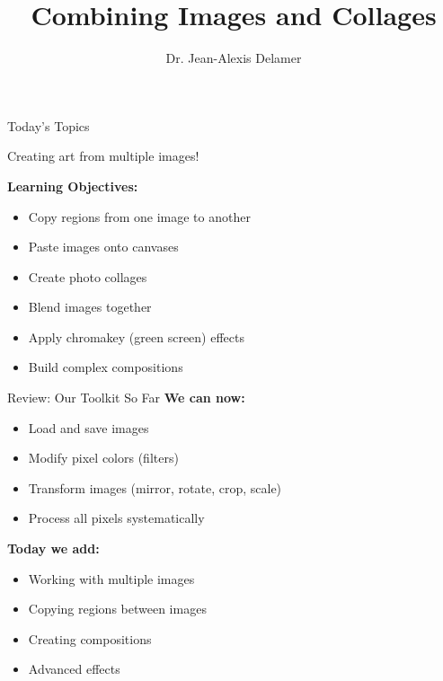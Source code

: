 \documentclass{csbeamer}
\title{Combining Images and Collages}
\author{Dr. Jean-Alexis Delamer}
\begin{document}
\begin{frame}
\titlepage
\end{frame}

\begin{frame}{Today's Topics}
    \begin{center}
        \Large Creating art from multiple images!
    \end{center}

    \vspace{1em}

    \textbf{Learning Objectives:}
    \begin{itemize}
        \item<1-> Copy regions from one image to another
        \item<2-> Paste images onto \textcolor{stfxblue}{canvases}
        \item<3-> Create \textcolor{marigold}{photo collages}
        \item<4-> Blend images together
        \item<5-> Apply \textcolor{stfxblue}{chromakey} (green screen) effects
        \item<6-> Build complex compositions
    \end{itemize}

    \vspace{1em}

    \begin{center}
    \end{center}
\end{frame}

\begin{frame}{Review: Our Toolkit So Far}
    \textbf{We can now:}
    \begin{itemize}
        \item Load and save images
        \item Modify pixel \textcolor{marigold}{colors} (filters)
        \item Transform images (mirror, rotate, crop, scale)
        \item Process all pixels systematically
    \end{itemize}

    \vspace{1em}

    \pause

    \textbf{Today we add:}
    \begin{itemize}
        \item<2-> Working with \textcolor{stfxblue}{multiple images}
        \item<2-> Copying regions between images
        \item<2-> Creating \textcolor{marigold}{compositions}
        \item<2-> Advanced effects
    \end{itemize}
\end{frame}
\end{document}
